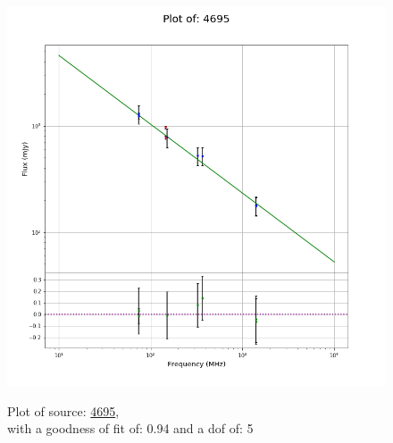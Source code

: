 \documentclass{article}
\begin{document}
\begin{figure}[H]
\begin{minipage}{0.5\textwidth}
        \includegraphics[scale = 0.35]{KmeulenSimSource_1hr/1hr4695.png}
        \captionsetup{labelformat=empty}
        \caption{Plot of source: \href{http://banana.transientskp.org/r4/vlo_KmeulenSimSource/runningcatalog/4695}{4695},\\with a goodness of fit of: 0.94 and a dof of: 5}
    \addtocounter{figure}{-1}
    \label{KmeulenSimSource:1hr:4695:plot}
    \end{minipage}
\end{figure}
\newpage
\end{document}

